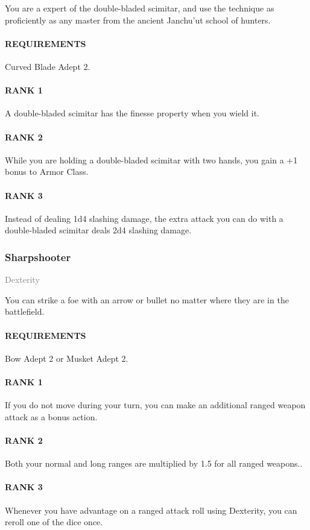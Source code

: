 \normalsize
You are a expert of the double-bladed scimitar, and use the technique as proficiently as any master from the ancient Janchu'ut school of hunters.
\paragraph{REQUIREMENTS} Curved Blade Adept 2.
\paragraph{RANK 1} A double-bladed scimitar has the finesse property when you wield it.
\paragraph{RANK 2} While you are holding a double-bladed scimitar with two hands, you gain a +1 bonus to Armor Class.
\paragraph{RANK 3} Instead of dealing 1d4 slashing damage, the extra attack you can do with a double-bladed scimitar deals 2d4 slashing damage.

\subsubsection{Sharpshooter} \label{feat::sharpshooter}
\small{\textcolor{gray}{Dexterity}}

\normalsize
You can strike a foe with an arrow or bullet no matter where they are in the battlefield.
\paragraph{REQUIREMENTS} Bow Adept 2 or Musket Adept 2.
\paragraph{RANK 1} If you do not move during your turn, you can make an additional ranged weapon attack as a bonus action.
\paragraph{RANK 2} Both your normal and long ranges are multiplied by 1.5 for all ranged weapons..
\paragraph{RANK 3} Whenever you have advantage on a ranged attack roll using Dexterity, you can reroll one of the dice once.

